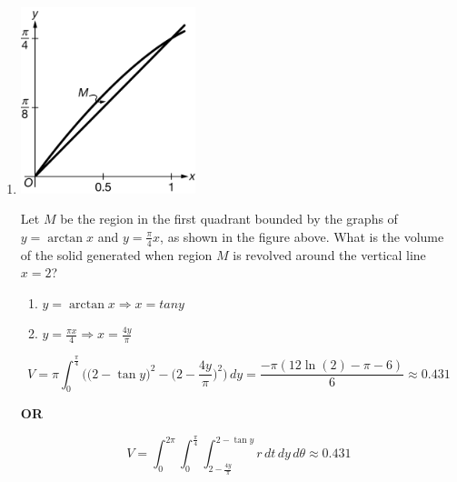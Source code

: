 \documentclass[12pt]{article}
\begin{document}
\begin{enumerate}
    \item 
    \begin{center}
        \includegraphics[width=2in]{4.034.png}
    \end{center}
    Let $M$ be the region in the first quadrant bounded by the graphs of $y=\arctan x$ and $y=\frac{\pi}{4}x$, as shown in the figure above. What is the volume of the solid generated when region $M$ is revolved around the vertical line $x=2$?
    \begin{enumerate}
        \item $y=\arctan x \Longrightarrow x =tan y$
        \item $y=\frac{\pi x}{4} \Longrightarrow x= \frac{4y}{\pi}$
    \end{enumerate}
    $$V=\pi\int_{0}^{\frac{\pi}{4}} \Biggr(\big(2-\tan y\big)^2 -\big(2-\frac{4y}{\pi}\big)^2\biggr)\, dy = \frac{-\pi(12\ln(2)-\pi-6)}{6}\approx \boxed{0.431}$$
    \begin{center}
        \textbf{OR}
    \end{center}
    $$V=\int_{0}^{2\pi}\int_{0}^{\frac{\pi}{4}}\int_{2-\frac{4y}{\pi}}^{2-\tan y} r \, dt\, dy\, d\theta \approx \boxed{0.431}$$
    

\end{enumerate}
\end{document}
